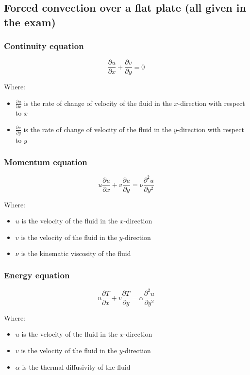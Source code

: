 \documentclass[11pt]{article}
\begin{document}
\subsection{Forced convection over a flat plate (all given in the exam)}
\label{sec:org8880c30}

\subsubsection{Continuity equation}
\label{sec:org92a8773}
\[\frac{\partial u}{\partial x} + \frac{\partial v}{\partial y} = 0\]

Where:
\begin{itemize}
\item \(\frac{\partial u}{\partial x}\) is the rate of change of velocity of the fluid in the \(x\)-direction with respect to \(x\)
\item \(\frac{\partial v}{\partial y}\) is the rate of change of velocity of the fluid in the \(y\)-direction with respect to \(y\)
\end{itemize}
\subsubsection{Momentum equation}
\label{sec:org4497b63}
\[u \frac{\partial u}{\partial x} + v \frac{\partial u}{\partial y} = \nu \frac{\partial^2 u}{\partial y^2}\]

Where:
\begin{itemize}
\item \(u\) is the velocity of the fluid in the \(x\)-direction
\item \(v\) is the velocity of the fluid in the \(y\)-direction
\item \(\nu\) is the kinematic viscosity of the fluid
\end{itemize}
\subsubsection{Energy equation}
\label{sec:org9aa6948}
\[u \frac{\partial T}{\partial x} + v \frac{\partial T}{\partial y} = \alpha \frac{\partial^2 u}{\partial y^2}\]

Where:
\begin{itemize}
\item \(u\) is the velocity of the fluid in the \(x\)-direction
\item \(v\) is the velocity of the fluid in the \(y\)-direction
\item \(\alpha\) is the thermal diffusivity of the fluid
\end{itemize}
\end{document}
